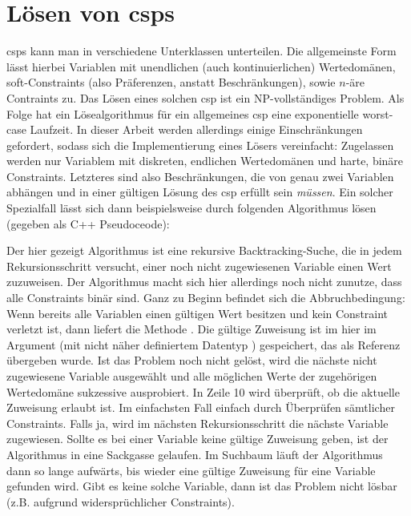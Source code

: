 \section{Lösen von \acp{csp}}
\acp{csp} kann man in verschiedene Unterklassen unterteilen. Die allgemeinste Form lässt hierbei Variablen mit unendlichen (auch kontinuierlichen) Wertedomänen, soft-Constraints
(also Präferenzen, anstatt Beschränkungen), sowie $n$-äre Contraints zu. Das Lösen eines solchen \ac*{csp} ist ein NP-vollständiges Problem. Als Folge hat ein Lösealgorithmus für
ein allgemeines \ac*{csp} eine exponentielle worst-case Laufzeit. In dieser Arbeit werden allerdings einige Einschränkungen gefordert, sodass sich die Implementierung eines Lösers
vereinfacht: Zugelassen werden nur Variablem mit diskreten, endlichen Wertedomänen und harte, binäre Constraints. Letzteres sind also Beschränkungen, die von genau zwei Variablen
abhängen und in einer gültigen Lösung des \ac*{csp} erfüllt sein \textit{müssen}. Ein solcher Spezialfall lässt sich dann beispielsweise durch folgenden Algorithmus lösen (gegeben
als C++ Pseudoceode):

Der hier gezeigt Algorithmus ist eine rekursive Backtracking-Suche, die in jedem Rekursionsschritt versucht, einer noch nicht zugewiesenen Variable einen Wert zuzuweisen. Der
Algorithmus macht sich hier allerdings noch nicht zunutze, dass alle Constraints binär sind. Ganz zu Beginn befindet sich die Abbruchbedingung: Wenn bereits alle Variablen einen
gültigen Wert besitzen und kein Constraint verletzt ist, dann liefert die Methode  . Die gültige Zuweisung ist im hier im Argument 
(mit nicht näher definiertem Datentyp ) gespeichert, das als Referenz übergeben wurde. Ist das Problem noch nicht gelöst, wird die nächste nicht zugewiesene Variable
ausgewählt und alle möglichen Werte der zugehörigen Wertedomäne sukzessive ausprobiert. In Zeile 10 wird überprüft, ob die aktuelle Zuweisung erlaubt ist. Im einfachsten Fall
einfach durch Überprüfen sämtlicher Constraints. Falls ja, wird im nächsten Rekursionsschritt die nächste Variable zugewiesen. Sollte es bei einer Variable keine gültige Zuweisung
geben, ist der Algorithmus in eine Sackgasse gelaufen. Im Suchbaum läuft der Algorithmus dann so lange aufwärts, bis wieder eine gültige Zuweisung für eine Variable gefunden wird.
Gibt es keine solche Variable, dann ist das Problem nicht lösbar (z.B. aufgrund  widersprüchlicher Constraints). 

